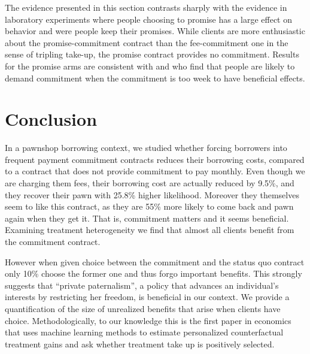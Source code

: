 \documentclass[11pt]{article}
\begin{document}
\vspace{.2in}
\noindent The evidence presented in this section contrasts sharply with the evidence in laboratory experiments where people choosing to promise has a large effect on behavior and were people keep their promises. While clients are more enthusiastic about the promise-commitment contract than the fee-commitment one in the sense of tripling take-up, the promise contract provides no commitment. Results for the promise arms are consistent with \cite{Ted} and \cite{John} who find that people are likely to demand commitment when the commitment is too week to have beneficial effects.
   
   


    
\section{Conclusion} \label{conclusion}

In a pawnshop borrowing context, we studied whether forcing borrowers into frequent payment commitment contracts reduces their borrowing costs, compared to a contract that does not provide commitment to pay monthly. Even though we are charging them fees, their borrowing cost are actually reduced by 9.5\%, and they recover their pawn with 25.8\% higher likelihood. Moreover they themselves seem to like this contract, as they are 55\% more likely to come back and pawn again when they get it. That is, commitment matters and it seems beneficial. Examining treatment heterogeneity we find that almost all clients benefit from the commitment contract. 

However when given choice between the commitment and the status quo contract only 10\% choose the former one and thus forgo important benefits. This strongly suggests that ``private paternalism'', a policy that advances an individual's interests by restricting her freedom, is beneficial in our context. We provide a quantification of the size of unrealized benefits that arise when clients have choice. Methodologically, to our knowledge this is the first paper in economics that uses machine learning methods to estimate personalized counterfactual treatment gains and ask whether treatment take up is positively selected.
\end{document}
